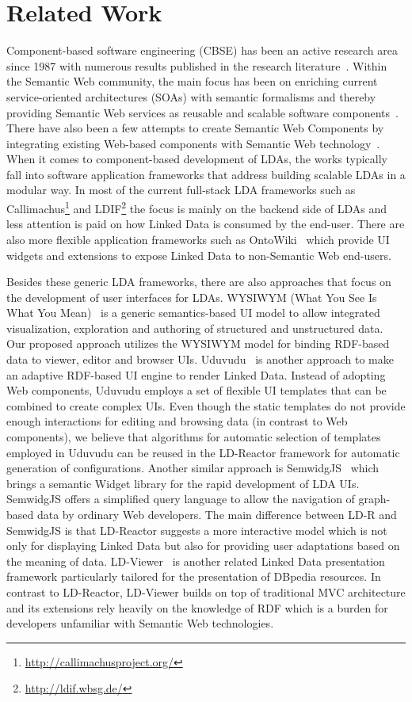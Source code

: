 \documentclass{acm_proc_article-sp}
\begin{document}
\section{Related Work}
Component-based software engineering (CBSE) has been an active research area since 1987 with numerous results published in the research literature~\cite{Vale2015}.
Within the Semantic Web community, the main focus has been on enriching current service-oriented architectures (SOAs) with semantic formalisms and thereby providing Semantic Web services as reusable and scalable software components~\cite{sws2015}.
There have also been a few attempts to create Semantic Web Components by integrating existing Web-based components with Semantic Web technology~\cite{pahl2011}.
When it comes to component-based development of LDAs, the works typically fall into 
software application frameworks that address building scalable LDAs in a modular way.
In most of the current full-stack LDA frameworks such as Callimachus\footnote{\url{http://callimachusproject.org/}} and LDIF\footnote{\url{http://ldif.wbsg.de/}} the focus is mainly on the backend side of LDAs and less attention is paid on how Linked Data is consumed by the end-user. 
There are also more flexible application frameworks such as OntoWiki~\cite{ontowiki-swj} which provide UI widgets and extensions to expose Linked Data to non-Semantic Web end-users.

Besides these generic LDA frameworks, there are also approaches that focus on the development of user interfaces for LDAs.
WYSIWYM (What You See Is What You Mean)~\cite{WYSIWYM2014} is a generic semantics-based UI model to allow integrated visualization, exploration and authoring of structured and unstructured data.
Our proposed approach utilizes the WYSIWYM model for binding RDF-based data to viewer, editor and browser UIs.
Uduvudu~\cite{Uduvudu2015} is another approach to make an adaptive RDF-based UI engine to render Linked Data.
Instead of adopting Web components, Uduvudu employs a set of flexible UI templates that can be combined to create complex UIs. 
Even though the static templates do not provide enough interactions for editing and browsing data (in contrast to Web components), we believe that algorithms for automatic selection of templates employed in Uduvudu can be reused in the LD-Reactor framework for automatic generation of configurations.
Another similar approach is SemwidgJS~\cite{StegemannZ14} which brings a semantic Widget library for the rapid development of LDA UIs.
SemwidgJS offers a simplified query language to allow the navigation of graph-based data by ordinary Web developers.
The main difference between LD-R and SemwidgJS is that LD-Reactor suggests a more interactive model which is not only for displaying Linked Data but also for providing user adaptations based on the meaning of data.
LD-Viewer~\cite{Lukovnikov2014} is another related Linked Data presentation framework particularly tailored for the presentation of DBpedia resources.
In contrast to LD-Reactor, LD-Viewer  builds on top of traditional MVC architecture and its extensions rely heavily on the knowledge of RDF which is a burden for developers unfamiliar with Semantic Web technologies.
\end{document}
